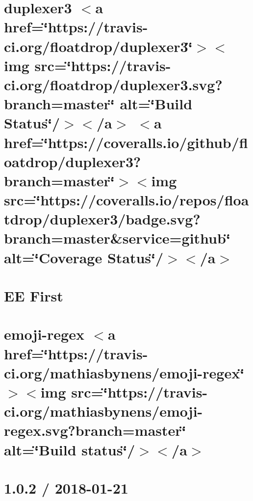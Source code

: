 \let\mypdfximage\pdfximage\def\pdfximage{\immediate\mypdfximage}\documentclass[twoside]{book}
\newcommand{\+}{\discretionary{\mbox{\scriptsize$\hookleftarrow$}}{}{}}
\begin{document}
\chapter{duplexer3 $<$a href=\char`\"{}https\+://travis-\/ci.\+org/floatdrop/duplexer3\char`\"{}$>$$<$img src=\char`\"{}https\+://travis-\/ci.\+org/floatdrop/duplexer3.\+svg?branch=master\char`\"{} alt=\char`\"{}\+Build Status\char`\"{}/$>$$<$/a$>$ $<$a href=\char`\"{}https\+://coveralls.\+io/github/floatdrop/duplexer3?branch=master\char`\"{}$>$$<$img src=\char`\"{}https\+://coveralls.\+io/repos/floatdrop/duplexer3/badge.\+svg?branch=master\&service=github\char`\"{} alt=\char`\"{}\+Coverage Status\char`\"{}/$>$$<$/a$>$}
\label{md__c_1__git_hub__p_r_o_y_e_c_t_o-_i_i_i-_g_o_t_rest-api-node-mysql_node_modules_duplexer3__r_e_a_d_m_e}

\chapter{EE First}
\label{md__c_1__git_hub__p_r_o_y_e_c_t_o-_i_i_i-_g_o_t_rest-api-node-mysql_node_modules_ee-first__r_e_a_d_m_e}

\chapter{emoji-\/regex $<$a href=\char`\"{}https\+://travis-\/ci.\+org/mathiasbynens/emoji-\/regex\char`\"{}$>$$<$img src=\char`\"{}https\+://travis-\/ci.\+org/mathiasbynens/emoji-\/regex.\+svg?branch=master\char`\"{} alt=\char`\"{}\+Build status\char`\"{}/$>$$<$/a$>$}
\label{md__c_1__git_hub__p_r_o_y_e_c_t_o-_i_i_i-_g_o_t_rest-api-node-mysql_node_modules_emoji-regex__r_e_a_d_m_e}

\chapter{1.0.2 / 2018-\/01-\/21}
\label{md__c_1__git_hub__p_r_o_y_e_c_t_o-_i_i_i-_g_o_t_rest-api-node-mysql_node_modules_encodeurl__h_i_s_t_o_r_y}

\end{document}
